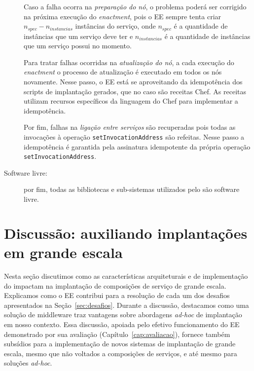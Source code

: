 \begin{description}
Caso a falha ocorra na \emph{preparação do nó},
o problema poderá ser corrigido na próxima execução do \emph{enactment},
pois o EE sempre tenta criar $n_{spec} - n_{instancias}$ instâncias do serviço, 
onde $n_{spec}$ é a quantidade de instâncias que um serviço deve ter
e $n_{instancias}$ é a quantidade de instâncias que um serviço possui no momento.

Para tratar falhas ocorridas na \emph{atualização do nó},
a cada execução do \emph{enactment} o processo de atualização
é executado em todos os nós novamente.
Nesse passo, o EE está se aproveitando da idempotência dos scripts
de implantação gerados, que no caso são receitas Chef.
As receitas utilizam recursos específicos da linguagem do Chef para implementar a idempotência.

Por fim, falhas na \emph{ligação entre serviços} são recuperadas pois todas
as invocações à operação \texttt{setInvocationAddress} são refeitas.
Nesse passo a idempotência é garantida pela assinatura idempotente
da própria operação \texttt{setInvocationAddress}.

\item [Software livre:] por fim, todas as bibliotecas e sub-sistemas
utilizados pelo \ee são software livre.

\end{description}

\section{Discussão: auxiliando implantações em grande escala}

Nesta seção discutimos como as características arquiteturais e de implementação do \ee
impactam na implantação de composições de serviço de grande escala.
Explicamos como o EE contribui para a resolução de cada um dos desafios
apresentados na Seção~\ref{sec:desafios}.
Durante a discussão, destacamos como uma solução de middleware traz vantagens
sobre abordagens \emph{ad-hoc} de implantação em nosso contexto.
Essa discussão, apoiada pelo efetivo funcionamento do EE demonstrado por sua avaliação
(Capítulo~\ref{cap:avaliacao}), fornece também subsídios para a implementação de novos sistemas
de implantação de grande escala, mesmo que não voltados a composições de serviços,
e até mesmo para soluções \emph{ad-hoc}.

